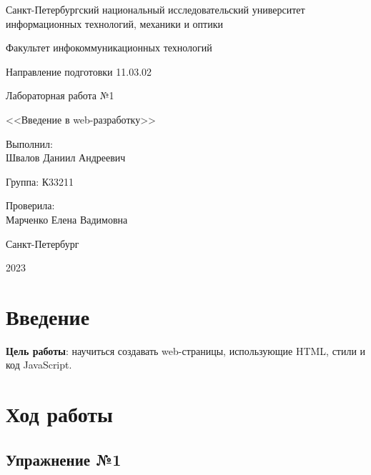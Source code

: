 \documentclass[a4paper, 14pt]{extarticle}
\begin{document}
\begin{titlepage}
  \vspace{0pt plus2fill}
  \noindent

  \vspace{0pt plus6fill}
  \begin{center}
    Санкт-Петербургский национальный исследовательский университет
    информационных технологий, механики и оптики

    \vspace{0pt plus3fill}

    Факультет инфокоммуникационных технологий

    Направление подготовки 11.03.02

    \vspace{0pt plus2fill}

    Лабораторная работа №1

    <<Введение в web-разработку>>

  \end{center}

  \vspace{0pt plus9fill}
  \begin{flushright}
    Выполнил: \\
    Швалов Даниил Андреевич

    Группа: К33211

    Проверила: \\
    Марченко Елена Вадимовна
  \end{flushright}

  \vspace{0pt plus2fill}
  \begin{center}
    Санкт-Петербург

    2023
  \end{center}
\end{titlepage}

\section{Введение}

\textbf{Цель работы}: научиться создавать web-страницы, использующие HTML,
стили и код JavaScript.

\section{Ход работы}

\subsection{Упражнение №1}
\end{document}
